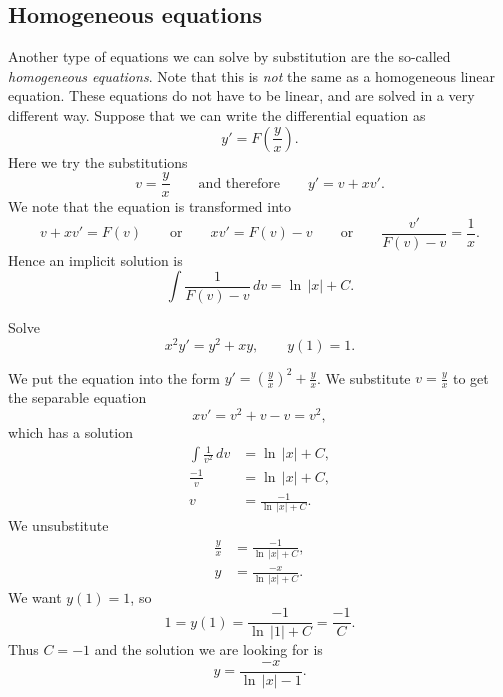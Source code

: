 \documentclass{ximera}
\begin{document}
\subsection{Homogeneous equations}

Another type of equations we can solve by substitution are the so-called \emph{homogeneous equations}. Note that this is \emph{not} the same as a homogeneous linear equation. These equations do not have to be linear, and are solved in a very different way. Suppose that we can write the differential equation as
\begin{equation*}
    y' = F\left(\frac{y}{x}\right) .
\end{equation*}
Here we try the substitutions
\begin{equation*}
    v = \frac{y}{x} \qquad \text{and therefore} \qquad y' = v + x v' .
\end{equation*}
We note that the equation is transformed into
\begin{equation*}
    v+ xv' = F(v) \qquad \text{or} \qquad xv' = F(v)-v \qquad \text{or} \qquad \frac{v'}{F(v)-v} = \frac{1}{x} .
\end{equation*}
Hence an implicit solution is
\begin{equation*}
    \int \frac{1}{F(v)-v} \,dv = \ln \, \lvert x \rvert + C .
\end{equation*}

\begin{example}
    Solve 
    \begin{equation*}
        x^2y' = y^2+xy, \qquad y(1)=1.
    \end{equation*}
\end{example}

\begin{exampleSol}
    We put the equation into the form $y'= {\left(\frac{y}{x}\right)}^2+\frac{y}{x}$.  We substitute $v=\frac{y}{x}$ to get the separable equation
    \begin{equation*}
        xv' = v^2+v-v = v^2 ,
    \end{equation*}
    which has a solution
    \begin{align*}
        \int \frac{1}{v^2} \,dv &= \ln \, \lvert x \rvert + C , \\
        \frac{-1}{v} &= \ln \, \lvert x \rvert + C , \\
        v &= \frac{-1}{\ln \, \lvert x \rvert + C} .
    \end{align*}
    We unsubstitute
    \begin{align*}
        \frac{y}{x} &= \frac{-1}{\ln \, \lvert x \rvert + C} , \\
        y &= \frac{-x}{\ln \, \lvert x \rvert + C} .
    \end{align*}
    We want $y(1)=1$, so 
    \begin{equation*}
        1 = y(1) = \frac{-1}{\ln \, \lvert 1 \rvert + C} = \frac{-1}{C} .
    \end{equation*}
    Thus $C = -1$ and the solution we are looking for is
    \begin{equation*}
        y = \frac{-x}{\ln \, \lvert x \rvert -1} .
    \end{equation*}
\end{exampleSol}
\end{document}
